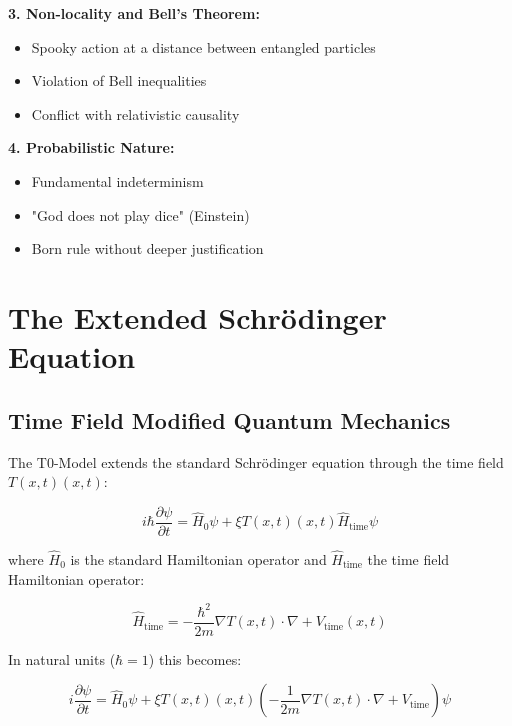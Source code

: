 \documentclass[12pt,a4paper]{report}
\newcommand{\Tfield}{T(x,t)}  %
\newcommand{\xipar}{\xi}      %
\begin{document}
	\textbf{3. Non-locality and Bell's Theorem:}
	\begin{itemize}
		\item Spooky action at a distance between entangled particles
		\item Violation of Bell inequalities
		\item Conflict with relativistic causality
	\end{itemize}
	
	\textbf{4. Probabilistic Nature:}
	\begin{itemize}
		\item Fundamental indeterminism
		\item "God does not play dice" (Einstein)
		\item Born rule without deeper justification
	\end{itemize}
	
	\section{The Extended Schrödinger Equation}\label{sec:extended_schrodinger}
	
	\subsection{Time Field Modified Quantum Mechanics}\label{subsec:timefield_modified_qm}
	
	The T0-Model extends the standard Schrödinger equation through the time field $\Tfield(x,t)$:
	
	\begin{equation}\label{eq:extended_schrodinger}
		i\hbar \frac{\partial \psi}{\partial t} = \hat{H}_0 \psi + \xipar \Tfield(x,t) \hat{H}_{\text{time}} \psi
	\end{equation}
	
	where $\hat{H}_0$ is the standard Hamiltonian operator and $\hat{H}_{\text{time}}$ the time field Hamiltonian operator:
	
	\begin{equation}\label{eq:timefield_hamilton}
		\hat{H}_{\text{time}} = -\frac{\hbar^2}{2m} \nabla \Tfield \cdot \nabla + V_{\text{time}}(x,t)
	\end{equation}
	
	In natural units ($\hbar = 1$) this becomes:
	
	\begin{equation}\label{eq:extended_schrodinger_nat}
		i \frac{\partial \psi}{\partial t} = \hat{H}_0 \psi + \xipar \Tfield(x,t) \left(-\frac{1}{2m} \nabla \Tfield \cdot \nabla + V_{\text{time}}\right) \psi
	\end{equation}
	
\end{document}
